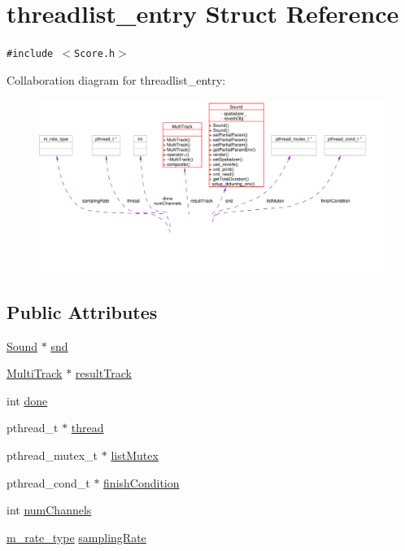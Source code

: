 \hypertarget{structthreadlist__entry}{
\section{threadlist\_\-entry Struct Reference}
\label{structthreadlist__entry}
}
{\tt \#include $<$Score.h$>$}

Collaboration diagram for threadlist\_\-entry:\begin{figure}[H]
\begin{center}
\leavevmode
\includegraphics[width=406pt]{structthreadlist__entry__coll__graph}
\end{center}
\end{figure}
\subsection*{Public Attributes}
\begin{CompactItemize}
\item 
\hyperlink{classSound}{Sound} $\ast$ \hyperlink{structthreadlist__entry_o0}{snd}
\item 
\hyperlink{classMultiTrack}{Multi\-Track} $\ast$ \hyperlink{structthreadlist__entry_o1}{result\-Track}
\item 
int \hyperlink{structthreadlist__entry_o2}{done}
\item 
pthread\_\-t $\ast$ \hyperlink{structthreadlist__entry_o3}{thread}
\item 
pthread\_\-mutex\_\-t $\ast$ \hyperlink{structthreadlist__entry_o4}{list\-Mutex}
\item 
pthread\_\-cond\_\-t $\ast$ \hyperlink{structthreadlist__entry_o5}{finish\-Condition}
\item 
int \hyperlink{structthreadlist__entry_o6}{num\-Channels}
\item 
\hyperlink{Types_8h_a4}{m\_\-rate\_\-type} \hyperlink{structthreadlist__entry_o7}{sampling\-Rate}
\end{CompactItemize}


